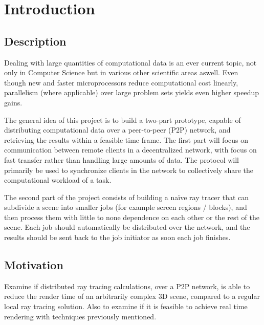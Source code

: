 \chapter{Introduction}
 
\section{Description}

Dealing with large quantities of computational data is an ever current topic, not only in Computer Science but in various other scientific areas aswell. Even though new and faster microprocessors reduce computational cost linearly, parallelism (where applicable) over large problem sets yields even higher speedup gains. 


The general idea of this project is to build a two-part prototype, capable of distributing computational data over a peer-to-peer (P2P) network, and retrieving the results within a feasible time frame. The first part will focus on communication between remote clients in a decentralized network, with focus on fast transfer rather than handling large amounts of data. The protocol will primarily be used to synchronize clients in the network to collectively share the computational workload of a task. 

The second part of the project consists of building a naïve ray tracer that can subdivide a scene into smaller jobs (for example screen regions / blocks), and then process them with little to none dependence on each other or the rest of the scene. Each job should automatically be distributed over the network, and the results should be sent back to the job initiator as soon each job finishes.

\section{Motivation}
Examine if distributed ray tracing calculations, over a P2P network, is able to reduce the render time of an arbitrarily complex 3D scene, compared to a regular local ray tracing solution. Also to examine if it is feasible to achieve real time rendering with techniques previously mentioned.
 